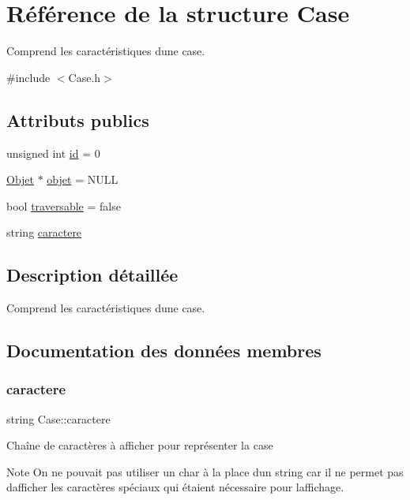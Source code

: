 \hypertarget{structCase}{}\section{Référence de la structure Case}
\label{structCase}


Comprend les caractéristiques d\textquotesingle{}une case.  




{\ttfamily \#include $<$Case.\+h$>$}

\subsection*{Attributs publics}
\begin{DoxyCompactItemize}
\item 
unsigned int \mbox{\hyperlink{structCase_a582822c41f72ea9c1ff300ecc3634913}{id}} = 0
\item 
\mbox{\hyperlink{structObjet}{Objet}} $\ast$ \mbox{\hyperlink{structCase_a182f9c3f43cf1a8aa3391cca353028b5}{objet}} = N\+U\+LL
\item 
bool \mbox{\hyperlink{structCase_a4e8e7bff6969ebe1b726d124da5ea2a9}{traversable}} = false
\item 
string \mbox{\hyperlink{structCase_a6ab3f70330dfe23518638688cf766b66}{caractere}}
\end{DoxyCompactItemize}


\subsection{Description détaillée}
Comprend les caractéristiques d\textquotesingle{}une case. 

\subsection{Documentation des données membres}
\mbox{\label{structCase_a6ab3f70330dfe23518638688cf766b66}} 
\subsubsection{\texorpdfstring{caractere}{caractere}}
{\footnotesize\ttfamily string Case\+::caractere}

Chaîne de caractères à afficher pour représenter la case \begin{DoxyNote}{Note}
On ne pouvait pas utiliser un char à la place d\textquotesingle{}un string car il ne permet pas d\textquotesingle{}afficher les caractères spéciaux qui étaient nécessaire pour l\textquotesingle{}affichage. 
\end{DoxyNote}
\mbox{\label{structCase_a582822c41f72ea9c1ff300ecc3634913}} 
